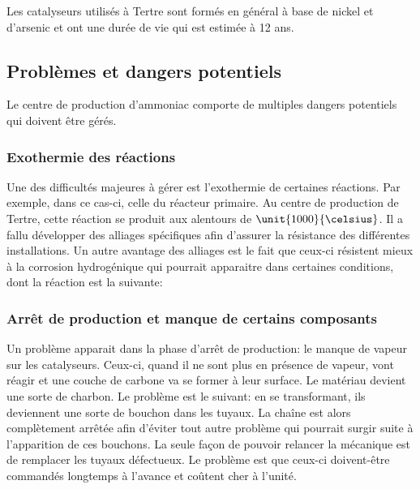 Les catalyseurs utilisés à Tertre sont formés en général à base de nickel et d'arsenic et ont une durée de vie qui est estimée à 12 ans.

\subsection{Problèmes et dangers potentiels}
Le centre de production d'ammoniac comporte de multiples dangers potentiels qui doivent être gérés. 

\subsubsection{Exothermie des réactions}
Une des difficultés majeures à gérer est l'exothermie de certaines réactions. Par exemple, dans ce cas-ci, celle du réacteur primaire. Au centre de production de Tertre, cette réaction se produit aux alentours de $\unit{1000}{\celsius}$. Il a fallu développer des alliages spécifiques afin d'assurer la résistance des différentes installations. Un autre avantage des alliages est le fait que ceux-ci résistent mieux à la corrosion hydrogénique qui pourrait apparaitre dans certaines conditions, dont la réaction est la suivante:


\subsubsection{Arrêt de production et manque de certains composants}
Un problème apparait dans la phase d'arrêt de production: le manque de vapeur sur les catalyseurs. Ceux-ci, quand il ne sont plus en présence de vapeur, vont réagir et une couche de carbone va se former à leur surface. Le matériau devient une sorte de charbon. Le problème est le suivant: en se transformant, ils deviennent une sorte de bouchon dans les tuyaux. La chaîne est alors complètement arrêtée afin d'éviter tout autre problème qui pourrait surgir suite à l'apparition de ces bouchons. La seule façon de pouvoir relancer la mécanique est de remplacer les tuyaux défectueux. Le problème est que ceux-ci doivent-être commandés longtemps à l'avance et coûtent cher à l'unité.

